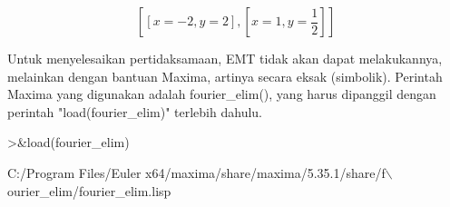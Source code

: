 \documentclass[a4paper,10pt]{article}
\begin{document}
\begin{eulernotebook}
\begin{eulercomment}
\begin{eulercomment}
\begin{eulerformula}
\[
\left[ \left[ x=-2 , y=2 \right]  , \left[ x=1 , y=\frac{1}{2}
  \right]  \right] 
\]
\end{eulerformula}
\begin{eulercomment}
Untuk menyelesaikan pertidaksamaan, EMT tidak akan dapat melakukannya,
melainkan dengan bantuan Maxima, artinya secara eksak (simbolik).
Perintah Maxima yang digunakan adalah fourier\_elim(), yang harus
dipanggil dengan perintah "load(fourier\_elim)" terlebih dahulu.
\end{eulercomment}
\begin{eulerprompt}
>&load(fourier_elim)
\end{eulerprompt}
\begin{euleroutput}
  
          C:/Program Files/Euler x64/maxima/share/maxima/5.35.1/share/f\(\backslash\)
  ourier_elim/fourier_elim.lisp
  

\end{euleroutput}
\end{eulercomment}
\end{eulercomment}
\end{eulernotebook}
\end{document}
